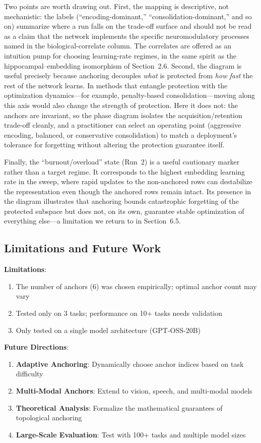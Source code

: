 \documentclass{article}
\begin{document}
Two points are worth drawing out. First, the mapping is descriptive, not mechanistic: the labels (``encoding-dominant,'' ``consolidation-dominant,'' and so on) summarize where a run falls on the trade-off surface and should not be read as a claim that the network implements the specific neuromodulatory processes named in the biological-correlate column. The correlates are offered as an intuition pump for choosing learning-rate regimes, in the same spirit as the hippocampal--embedding isomorphism of Section~2.6. Second, the diagram is useful precisely because anchoring decouples \emph{what} is protected from \emph{how fast} the rest of the network learns. In methods that entangle protection with the optimization dynamics---for example, penalty-based consolidation---moving along this axis would also change the strength of protection. Here it does not: the anchors are invariant, so the phase diagram isolates the acquisition/retention trade-off cleanly, and a practitioner can select an operating point (aggressive encoding, balanced, or conservative consolidation) to match a deployment's tolerance for forgetting without altering the protection guarantee itself.

Finally, the ``burnout/overload'' state (Run~2) is a useful cautionary marker rather than a target regime. It corresponds to the highest embedding learning rate in the sweep, where rapid updates to the non-anchored rows can destabilize the representation even though the anchored rows remain intact. Its presence in the diagram illustrates that anchoring bounds catastrophic forgetting of the protected subspace but does not, on its own, guarantee stable optimization of everything else---a limitation we return to in Section~6.5.

\subsection{Limitations and Future Work}

\textbf{Limitations}:
\begin{enumerate}
\item The number of anchors (6) was chosen empirically; optimal anchor count may vary
\item Tested only on 3 tasks; performance on 10+ tasks needs validation
\item Only tested on a single model architecture (GPT-OSS-20B)
\end{enumerate}

\textbf{Future Directions}:
\begin{enumerate}
\item \textbf{Adaptive Anchoring}: Dynamically choose anchor indices based on task difficulty
\item \textbf{Multi-Modal Anchors}: Extend to vision, speech, and multi-modal models
\item \textbf{Theoretical Analysis}: Formalize the mathematical guarantees of topological anchoring
\item \textbf{Large-Scale Evaluation}: Test with 100+ tasks and multiple model sizes
\end{enumerate}
\end{document}
